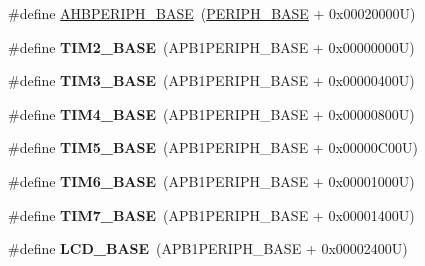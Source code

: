 \begin{DoxyCompactItemize}
\item 
\#define \hyperlink{group___peripheral__memory__map_ga92eb5d49730765d2abd0f5b09548f9f5}{A\-H\-B\-P\-E\-R\-I\-P\-H\-\_\-\-B\-A\-S\-E}~(\hyperlink{group___peripheral__memory__map_ga9171f49478fa86d932f89e78e73b88b0}{P\-E\-R\-I\-P\-H\-\_\-\-B\-A\-S\-E} + 0x00020000\-U)
\item 
\hypertarget{group___peripheral__memory__map_ga00d0fe6ad532ab32f0f81cafca8d3aa5}{\#define {\bfseries T\-I\-M2\-\_\-\-B\-A\-S\-E}~(A\-P\-B1\-P\-E\-R\-I\-P\-H\-\_\-\-B\-A\-S\-E + 0x00000000\-U)}\label{group___peripheral__memory__map_ga00d0fe6ad532ab32f0f81cafca8d3aa5}

\item 
\hypertarget{group___peripheral__memory__map_gaf0c34a518f87e1e505cd2332e989564a}{\#define {\bfseries T\-I\-M3\-\_\-\-B\-A\-S\-E}~(A\-P\-B1\-P\-E\-R\-I\-P\-H\-\_\-\-B\-A\-S\-E + 0x00000400\-U)}\label{group___peripheral__memory__map_gaf0c34a518f87e1e505cd2332e989564a}

\item 
\hypertarget{group___peripheral__memory__map_ga56e2d44b0002f316527b8913866a370d}{\#define {\bfseries T\-I\-M4\-\_\-\-B\-A\-S\-E}~(A\-P\-B1\-P\-E\-R\-I\-P\-H\-\_\-\-B\-A\-S\-E + 0x00000800\-U)}\label{group___peripheral__memory__map_ga56e2d44b0002f316527b8913866a370d}

\item 
\hypertarget{group___peripheral__memory__map_ga3e1671477190d065ba7c944558336d7e}{\#define {\bfseries T\-I\-M5\-\_\-\-B\-A\-S\-E}~(A\-P\-B1\-P\-E\-R\-I\-P\-H\-\_\-\-B\-A\-S\-E + 0x00000\-C00\-U)}\label{group___peripheral__memory__map_ga3e1671477190d065ba7c944558336d7e}

\item 
\hypertarget{group___peripheral__memory__map_ga8268ec947929f192559f28c6bf7d1eac}{\#define {\bfseries T\-I\-M6\-\_\-\-B\-A\-S\-E}~(A\-P\-B1\-P\-E\-R\-I\-P\-H\-\_\-\-B\-A\-S\-E + 0x00001000\-U)}\label{group___peripheral__memory__map_ga8268ec947929f192559f28c6bf7d1eac}

\item 
\hypertarget{group___peripheral__memory__map_ga0ebf54364c6a2be6eb19ded6b18b6387}{\#define {\bfseries T\-I\-M7\-\_\-\-B\-A\-S\-E}~(A\-P\-B1\-P\-E\-R\-I\-P\-H\-\_\-\-B\-A\-S\-E + 0x00001400\-U)}\label{group___peripheral__memory__map_ga0ebf54364c6a2be6eb19ded6b18b6387}

\item 
\hypertarget{group___peripheral__memory__map_ga017749aad23300240ef5ac4c3d5ca750}{\#define {\bfseries L\-C\-D\-\_\-\-B\-A\-S\-E}~(A\-P\-B1\-P\-E\-R\-I\-P\-H\-\_\-\-B\-A\-S\-E + 0x00002400\-U)}\label{group___peripheral__memory__map_ga017749aad23300240ef5ac4c3d5ca750}


\end{DoxyCompactItemize}
